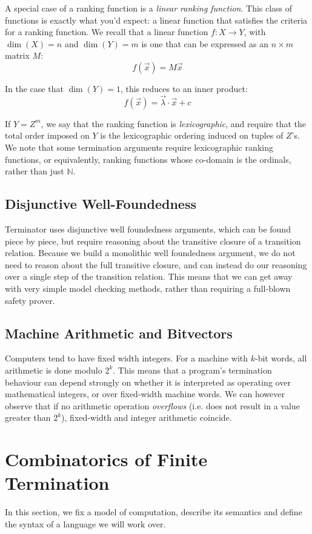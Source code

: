 \documentclass[preprint]{sigplanconf}
\theoremstyle{definition}
\begin{document}
A special case of a ranking function is a \emph{linear ranking function}.  This
class of functions is exactly what you'd expect: a linear function that satisfies
the criteria for a ranking function.  We recall that a linear function $f: X \to Y$,
with $\dim(X) = n$ and $\dim(Y) = m$
is one that can be expressed as an $n \times m$ matrix $M$:
$$f(\vec{x}) = M\vec{x}$$

In the case that $\dim(Y) = 1$, this reduces to an inner product:
$$f(\vec{x}) = \vec{\lambda} \cdotp \vec{x} + c$$

If $Y = Z^m$, we say that the ranking function is \emph{lexicographic},
and require that the total order imposed on $Y$ is the lexicographic ordering
induced on tuples of $Z$'s.  We note that some termination arguments
require lexicographic ranking functions, or equivalently, ranking functions
whose co-domain is the ordinals, rather than just $\mathbb{N}$.

\subsection{Disjunctive Well-Foundedness}
Terminator uses disjunctive well foundedness arguments, which can be found
piece by piece, but require reasoning about the transitive closure of a transition
relation.  Because we build a monolithic well foundedness argument, we
do not need to reason about the full transitive closure, and can instead do our
reasoning over a single step of the transition relation.  This means that we
can get away with very simple model checking methods, rather than requiring
a full-blown safety prover.

\subsection{Machine Arithmetic and Bitvectors}
Computers tend to have fixed width integers.  For a machine with $k$-bit words,
all arithmetic is done modulo $2^k$.  This means that a program's termination
behaviour can depend strongly on whether it is interpreted as operating over
mathematical integers, or over fixed-width machine words.  We can however
observe that if no arithmetic operation \emph{overflows} (i.e. does not result
in a value greater than $2^k$), fixed-width and integer arithmetic coincide.

\section{Combinatorics of Finite Termination}
In this section, we fix a model of computation, describe its semantics and
define the syntax of a language we will work over.
\end{document}
